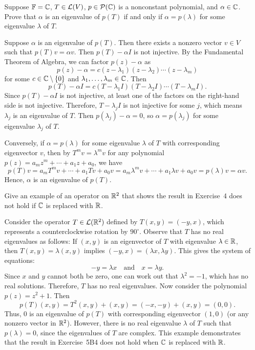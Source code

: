 \begin{exc}
\begin{exercise}
Suppose $\mathbb{F}=\mathbb{C}$, $T\in\mathcal{L}(V)$, $p\in\mathcal{P}(\mathbb{C})$ is a nonconstant polynomial,
and $\alpha\in\mathbb{C}$. Prove that $\alpha$ is an eigenvalue of $p(T)$ if and only
if $\alpha=p(\lambda)$ for some eigenvalue $\lambda$ of $T$.
\end{exercise}
\begin{solution}
Suppose $\alpha$ is an eigenvalue of $p(T)$. Then there exists a nonzero
vector $v\in V$ such that $p(T)v=\alpha v$. Then $p(T)-\alpha I$ is not
injective. By the Fundamental Theorem of Algebra, we can factor $p(z)-\alpha$
as
\[ p(z)-\alpha=c(z-\lambda_1)(z-\lambda_2)\cdots(z-\lambda_m) \]
for some $c\in\mathbb{C}\setminus\{0\}$ and $\lambda_1,\dots,\lambda_m\in\mathbb{C}$. Then
\[ p(T)-\alpha I=c(T-\lambda_1I)(T-\lambda_2I)\cdots(T-\lambda_mI). \]
Since $p(T)-\alpha I$ is not injective, at least one of the factors on the
right-hand side is not injective. Therefore, $T-\lambda_jI$ is not injective
for some $j$, which means $\lambda_j$ is an eigenvalue of $T$. Then
$p(\lambda_j)-\alpha=0$, so $\alpha=p(\lambda_j)$ for some eigenvalue
$\lambda_j$ of $T$.

Conversely, if $\alpha=p(\lambda)$ for some eigenvalue $\lambda$ of $T$ with
corresponding eigenvector $v$, then by $T^mv=\lambda^mv$ for any polynomial
$p(z)=a_mz^m+\cdots+a_1z+a_0$, we have
\[ p(T)v=a_mT^mv+\cdots+a_1Tv+a_0v=a_m\lambda^mv+\cdots+a_1\lambda v+a_0v
   =p(\lambda)v=\alpha v. \]
Hence, $\alpha$ is an eigenvalue of $p(T)$.
\end{solution}

\begin{exercise}
Give an example of an operator on $\mathbb{R}^2$ that shows the result in Exercise~4
does not hold if $\mathbb{C}$ is replaced with $\mathbb{R}$.
\end{exercise}
\begin{solution}
Consider the operator $T\in\mathcal{L}(\mathbb{R}^2)$ defined by $T(x,y)=(-y,x)$, which
represents a counterclockwise rotation by $90^\circ$. Observe that $T$ has no
real eigenvalues as follows: If $(x,y)$ is an eigenvector of $T$ with
eigenvalue $\lambda\in\mathbb{R}$, then $T(x,y)=\lambda(x,y)$ implies
$(-y,x)=(\lambda x,\lambda y)$. This gives the system of equations:
\[ -y=\lambda x \quad\text{and}\quad x=\lambda y. \]
Since $x$ and $y$ cannot both be zero, one can work out that $\lambda^2=-1$,
which has no real solutions. Therefore, $T$ has no real eigenvalues. Now
consider the polynomial $p(z)=z^2+1$. Then
\[ p(T)(x,y)=T^2(x,y)+(x,y)=(-x,-y)+(x,y)=(0,0). \]
Thus, $0$ is an eigenvalue of $p(T)$ with corresponding eigenvector $(1,0)$
(or any nonzero vector in $\mathbb{R}^2$). However, there is no real eigenvalue
$\lambda$ of $T$ such that $p(\lambda)=0$, since the eigenvalues of $T$ are
complex. This example demonstrates that the result in Exercise~5B4 does not
hold when $\mathbb{C}$ is replaced with $\mathbb{R}$.
\end{solution}


\end{exc}
